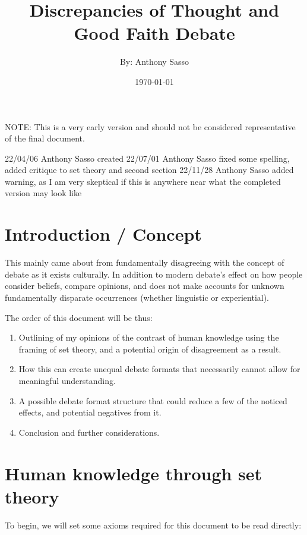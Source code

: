 \documentclass{article}
\title          {\Huge Discrepancies of Thought and Good Faith Debate}
\author         {By: Anthony Sasso}
\date           {\today}
\begin{document}
\maketitle

{NOTE: This is a very early version and should not be considered representative of the final document.}

\begin{versionhistory}
		{22/04/06}	{Anthony Sasso}	{created}
		{22/07/01}	{Anthony Sasso}	{fixed some spelling, added critique to set theory and second section}
		{22/11/28}	{Anthony Sasso}	{added warning, as I am very skeptical if this is anywhere near what the completed version may look like}
\end{versionhistory}

\tableofcontents

\newpage
\section{Introduction / Concept}
This mainly came about from fundamentally disagreeing with the concept of debate as it exists culturally. In addition to modern debate's effect on how people consider beliefs, compare opinions, and does not make accounts for unknown fundamentally disparate occurrences (whether linguistic or experiential).

\bigskip
The order of this document will be thus:

\begin{enumerate}
	\item Outlining of my opinions of the contrast of human knowledge using the framing of set theory, and a potential origin of disagreement as a result.

	\item How this can create unequal debate formats that necessarily cannot allow for meaningful understanding.

	\item A possible debate format structure that could reduce a few of the noticed effects, and potential negatives from it.

	\item Conclusion and further considerations.
\end{enumerate}

\section{Human knowledge through set theory}
To begin, we will set some axioms required for this document to be read directly:
\end{document}
